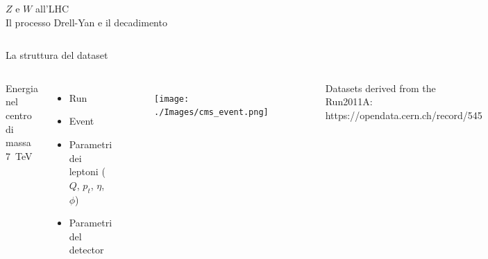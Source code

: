 \documentclass{beamer}
\begin{document}
\begin{frame}{$Z$ e $W$ all'LHC\\ Il processo Drell-Yan e il decadimento}
\begin{columns}[T]
  \end{columns}

\end{frame}

\begin{frame}{La struttura del dataset}
  \begin{columns}[T]
      \vspace*{4ex}
      \begin{block}{}
        \centering
        Energia nel centro di massa\linebreak
        \SI{7}{\tera\electronvolt}
        \vspace*{.3ex}
      \end{block}
      \vspace*{1ex}
      \begin{itemize}
        \item Run 
        \item Event
        \item Parametri dei leptoni ($Q$, $p_t$, $\eta$, $\phi$)
        \item Parametri del detector
      \end{itemize}

      \vspace*{4ex}
      \begin{figure}
        \centering
        \texttt{[image: ./Images/cms\_event.png]}
      \end{figure}
  \begin{flushright}
    \vspace{-3ex}
  \end{flushright}
  \vspace*{.7ex}
  \begin{center}
    \scriptsize
    Datasets derived from the Run2011A:\\
    https://opendata.cern.ch/record/545
  \end{center}
  \vspace*{1.5ex}
  \end{columns}
\end{frame}
\end{document}
